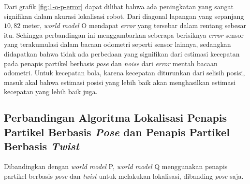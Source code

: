 Dari grafik \ref{fig:1-o-p-error} dapat dilihat bahwa ada peningkatan yang sangat signifikan dalam akurasi lokalisasi robot. Dari diagonal lapangan yang sepanjang $10,82$ meter, \textit{world model} O mendapat \textit{error} yang tersebar dalam rentang sebesar itu. Sehingga perbandingan ini menggambarkan seberapa berisiknya \textit{error} sensor yang terakumulasi dalam bacaan odometri seperti sensor lainnya, sedangkan didapatkan bahwa tidak ada perbedaan yang signifikan dari estimasi kecepatan pada penapis partikel berbasis \textit{pose} dan \textit{noise} dari \textit{error} mentah bacaan odometri. Untuk kecepatan bola, karena kecepatan diturunkan dari selisih posisi, masuk akal bahwa estimasi posisi yang lebih baik akan menghasilkan estimasi kecepatan yang lebih baik juga.

\subsection{Perbandingan Algoritma Lokalisasi Penapis Partikel Berbasis \textit{Pose} dan Penapis Partikel Berbasis \textit{Twist}}

Dibandingkan dengan \textit{world model} P, \textit{world model} Q menggunakan penapis partikel berbasis \textit{pose} dan \textit{twist} untuk melakukan lokalisasi, dibanding \textit{pose} saja.

